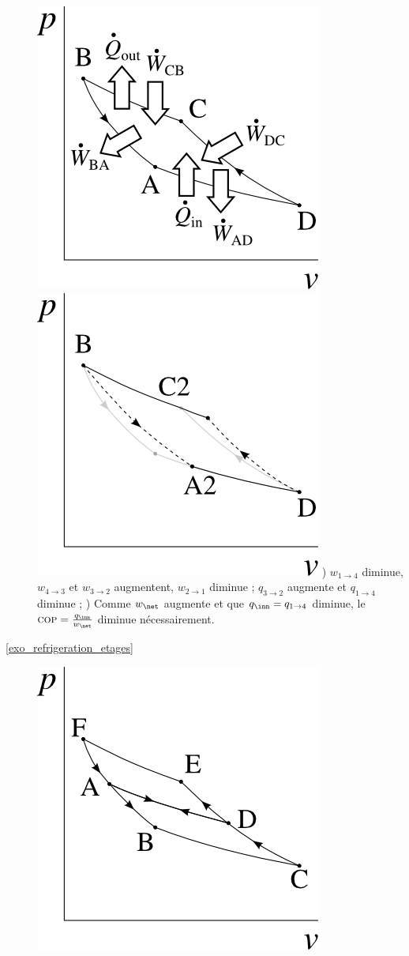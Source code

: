 \begin{description}
					\includegraphics[width=\solutiondiagramwidth]{images/exo_sol_pv_carnot_refrigerateur_transferts.png}
					\includegraphics[width=\solutiondiagramwidth]{images/exo_sol_pv_carnot_refrigerateur_irreversibilites.png}
					) $w_{1\to 4}$ diminue, $w_{4\to 3}$ et $w_{3\to 2}$ augmentent, $w_{2\to 1}$ diminue ; $q_{3\to 2}$ augmente et $q_{1\to 4}$ diminue ;
					) Comme $w_\net$ augmente et que $q_\inn = q_{1\to 4}$ diminue, le $\textsc{cop} = \frac{q_\inn}{w_\net}$ diminue nécessairement.
		\item [\ref{exo_refrigeration_etages}]
					\includegraphics[height=\solutiondiagramwidth]{images/exo_sol_pv_refrigeration_etages_1.png}

\end{description}
